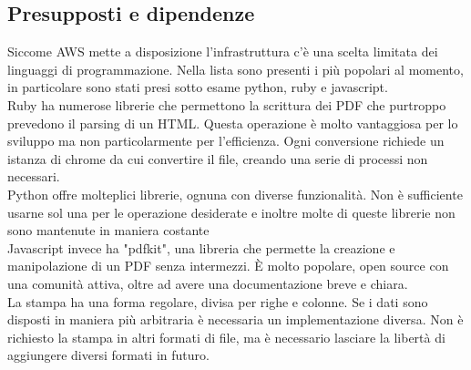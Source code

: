 \documentclass[12pt]{article}
\begin{document}
\subsection{Presupposti e dipendenze}
Siccome AWS mette a disposizione l'infrastruttura c'è una scelta limitata dei 
linguaggi di programmazione.
Nella lista sono presenti i più popolari al momento,
in particolare sono stati presi sotto esame python, ruby e javascript.
\\ Ruby ha numerose librerie che permettono la scrittura dei PDF che purtroppo
prevedono il parsing di un HTML.
Questa operazione è molto vantaggiosa per lo sviluppo ma non particolarmente 
per l'efficienza.
Ogni conversione richiede un istanza di chrome da cui convertire il file,
creando una serie di processi non necessari.  
\\ Python offre molteplici librerie, ognuna con diverse funzionalità. Non è 
sufficiente usarne sol una per le operazione desiderate e inoltre 
molte di queste librerie non sono mantenute in maniera costante
\\ Javascript invece ha "pdfkit", una libreria che permette la creazione e manipolazione 
di un PDF senza intermezzi. È molto popolare, open source con una comunità 
attiva, oltre ad avere una documentazione breve e chiara.
\\ La stampa ha una forma regolare, divisa per righe e colonne. Se i dati sono 
disposti in maniera più arbitraria è necessaria un implementazione diversa. 
Non è richiesto la stampa in altri formati di file, ma è necessario lasciare 
la libertà di aggiungere diversi formati in futuro.
\end{document}
